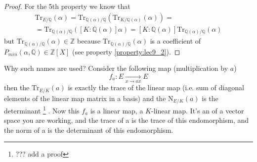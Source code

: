 \begin{property}
\begin{proof}
    For the 5th property we know that
    \begin{eqnarray}
    \mathrm{Tr}_{E/\mathbb{Q}}\left(\alpha\right) =
    \mathrm{Tr}_{\mathbb{Q}(\alpha)/\mathbb{Q}}\left(
    \mathrm{Tr}_{K/\mathbb{Q}(\alpha)}\left(\alpha\right)
    \right) =
    \nonumber \\
    =
    \mathrm{Tr}_{\mathbb{Q}(\alpha)/\mathbb{Q}}\left(
    \left[K:\mathbb{Q}(\alpha)\right] \alpha
    \right) =
    \left[K:\mathbb{Q}(\alpha)\right]
    \mathrm{Tr}_{\mathbb{Q}(\alpha)/\mathbb{Q}}\left(
     \alpha
    \right)
    \nonumber
    \end{eqnarray}
    but
    \(
    \mathrm{Tr}_{\mathbb{Q}(\alpha)/\mathbb{Q}}\left(
    \alpha
    \right) \in \mathbb{Z}
    \)
    because
    \(
    \mathrm{Tr}_{\mathbb{Q}(\alpha)/\mathbb{Q}}\left(
    \alpha
    \right)
    \) is a coefficient of $P_{min}\left(\alpha, \mathbb{Q}\right) \in
    \mathbb{Z}\left[X\right]$ (see property \ref{property:lec9_2}).     
  \end{proof}
  \label{property:lec9_norm_trace}
\end{property}

Why such names are used? Consider the following map
(multiplication by $a$)
\[
f_a: E \xrightarrow[x \to a x]{} E
\]
then the $\mathrm{Tr}_{E/K}\left(a\right)$ is exactly the trace of the
linear map (i.e. sum of diagonal elements of the linear map matrix in
a basis) and the $\mathrm{N}_{E/K}\left(a\right)$ is the
determinant
\footnote{
  ??? add a proof
}
. Now this $f_a$ is a linear map, a $K$-linear map. It's an
 of a vector space you are working, and the trace of a is
the trace of this endomorphism, and the norm of a is the determinant
of this endomorphism.  

